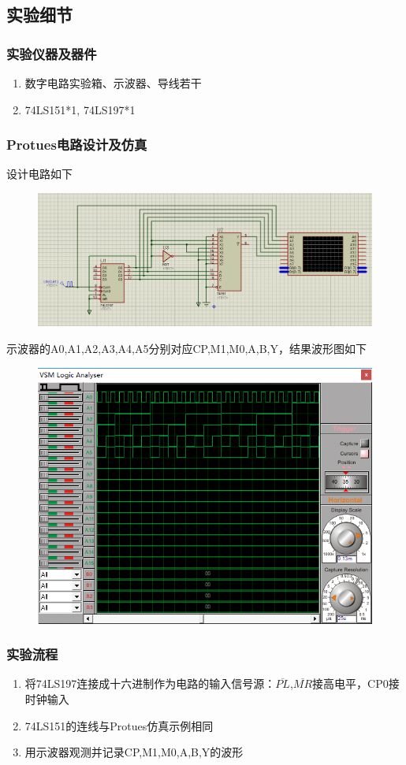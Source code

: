 \documentclass[11pt,UTF8]{ctexart}
\begin{document}
\subsection{实验细节}
\subsubsection{实验仪器及器件}
\begin{enumerate}
    \item 数字电路实验箱、示波器、导线若干
    \item 74LS151*1, 74LS197*1
\end{enumerate}

\subsubsection{Protues电路设计及仿真}
设计电路如下
\begin{figure}[H]
    \centering
    \includegraphics[width=0.9\linewidth]{fig/74151.PNG}
\end{figure}
\par 示波器的A0,A1,A2,A3,A4,A5分别对应CP,M1,M0,A,B,Y，结果波形图如下
\begin{figure}[H]
    \centering
    \includegraphics[width=0.5\linewidth]{fig/74151_wave.PNG}
\end{figure}

\subsubsection{实验流程}
\begin{enumerate}
    \item 将74LS197连接成十六进制作为电路的输入信号源：$\overline{PL}$,$\overline{MR}$接高电平，CP0接时钟输入
    \item 74LS151的连线与Protues仿真示例相同
    \item 用示波器观测并记录CP,M1,M0,A,B,Y的波形
\end{enumerate}
\end{document}
